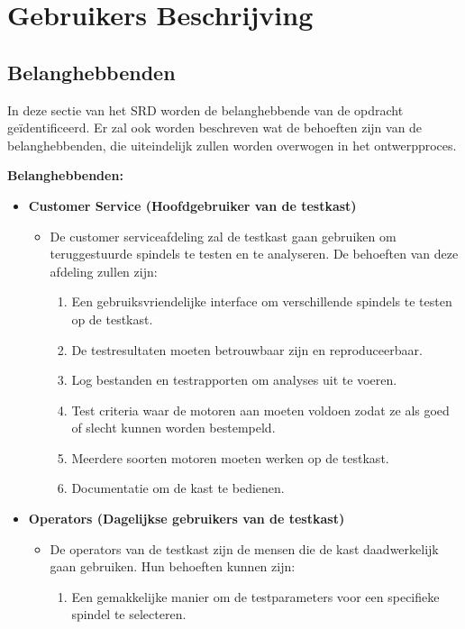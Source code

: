 \section{Gebruikers Beschrijving}

\subsection{Belanghebbenden}
In deze sectie van het SRD worden de belanghebbende van de opdracht geïdentificeerd. Er zal ook worden beschreven wat de behoeften zijn van de belanghebbenden, die uiteindelijk zullen worden overwogen in het ontwerpproces.

\textbf{Belanghebbenden:}

\begin{itemize}
	\item \textbf{Customer Service (Hoofdgebruiker van de testkast)}
	\begin{itemize}
		\item De customer serviceafdeling zal de testkast gaan gebruiken om teruggestuurde spindels te testen en te analyseren. De behoeften van deze afdeling zullen zijn:
		\begin{enumerate}
			\item Een gebruiksvriendelijke interface om verschillende spindels te testen op de testkast.
			
			\item De testresultaten moeten betrouwbaar zijn en reproduceerbaar.
			
			\item Log bestanden en testrapporten om analyses uit te voeren.
			
			\item Test criteria waar de motoren aan moeten voldoen zodat ze als goed of slecht kunnen worden bestempeld.
			
			\item Meerdere soorten motoren moeten werken op de testkast.
			
			\item Documentatie om de kast te bedienen.
		\end{enumerate}
	\end{itemize}
	
	\item \textbf{Operators (Dagelijkse gebruikers van de testkast)}
	\begin{itemize}
		\item De operators van de testkast zijn de mensen die de kast daadwerkelijk gaan gebruiken. Hun behoeften kunnen zijn:
		\begin{enumerate}
			\item Een gemakkelijke manier om de testparameters voor een specifieke spindel te selecteren.
			

\end{enumerate}
\end{itemize}
\end{itemize}

